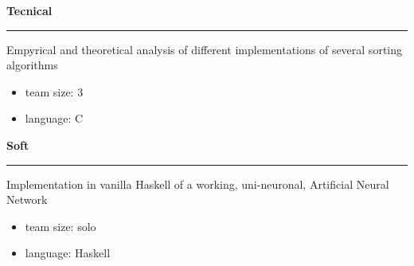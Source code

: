 \documentclass [10pt, a4paper] {extarticle}
\newcommand{\rightcolumwidth}{
    0.82
}
\begin{document}
    \begin {flushright}
    \begin {minipage} [t] {\rightcolumwidth\textwidth}
        \begin {minipage} [t] {0.475\textwidth}
            \textbf {Tecnical} \\ [-5px]
            \hrule
            \vspace {4px} Empyrical and theoretical analysis of different implementations of several sorting algorithms
            \vspace {-4px}
            \begin {itemize} [noitemsep]
            \item team size: 3
            \item language: C
            \end {itemize}
        \end {minipage}
        \hfill
        \begin {minipage} [t] {0.475\textwidth}
            \textbf {Soft} \\ [-5px]
            \hrule
            \vspace {4px} Implementation in vanilla Haskell of a working, uni-neuronal, Artificial Neural Network
            \vspace {-4px}
            \begin {itemize} [noitemsep]
                \item team size: solo
                \item language: Haskell
            \end {itemize}
        \end {minipage}
    \end {minipage}
    \end {flushright}
\end{document}
